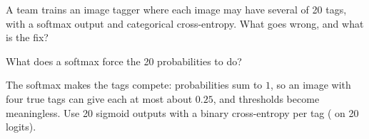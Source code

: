 \begin{problem}\onechili
	A team trains an image tagger where each image may have several of 20 tags, with a
	softmax output and categorical cross-entropy. What goes wrong, and what is the fix?
	\begin{hint}What does a softmax force the 20 probabilities to do?\end{hint}
	\begin{sol}
		The softmax makes the tags compete: probabilities sum to $1$, so an image with
		four true tags can give each at most about $0.25$, and thresholds become
		meaningless. Use 20 sigmoid outputs with a binary cross-entropy per tag
		( on 20 logits).
	\end{sol}
\end{problem}
